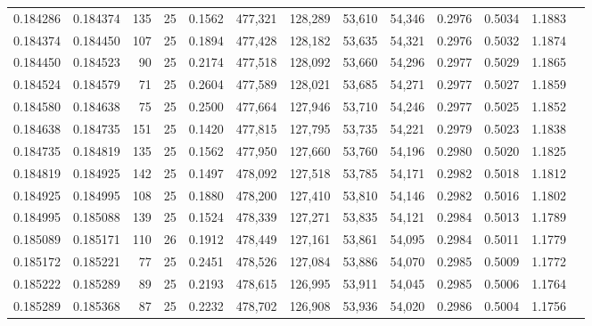 \begin{tabular}{rrrrrrrrrrrrr}
0.184286 & 0.184374 &   135 &  25 &                                     0.1562 & 477,321 & 128,289 &  53,610 &  54,346 & 0.2976 & 0.5034 & 1.1883 \\
0.184374 & 0.184450 &   107 &  25 &                                     0.1894 & 477,428 & 128,182 &  53,635 &  54,321 & 0.2976 & 0.5032 & 1.1874 \\
0.184450 & 0.184523 &    90 &  25 &                                     0.2174 & 477,518 & 128,092 &  53,660 &  54,296 & 0.2977 & 0.5029 & 1.1865 \\
0.184524 & 0.184579 &    71 &  25 &                                     0.2604 & 477,589 & 128,021 &  53,685 &  54,271 & 0.2977 & 0.5027 & 1.1859 \\
0.184580 & 0.184638 &    75 &  25 &                                     0.2500 & 477,664 & 127,946 &  53,710 &  54,246 & 0.2977 & 0.5025 & 1.1852 \\
0.184638 & 0.184735 &   151 &  25 &                                     0.1420 & 477,815 & 127,795 &  53,735 &  54,221 & 0.2979 & 0.5023 & 1.1838 \\
0.184735 & 0.184819 &   135 &  25 &                                     0.1562 & 477,950 & 127,660 &  53,760 &  54,196 & 0.2980 & 0.5020 & 1.1825 \\
0.184819 & 0.184925 &   142 &  25 &                                     0.1497 & 478,092 & 127,518 &  53,785 &  54,171 & 0.2982 & 0.5018 & 1.1812 \\
0.184925 & 0.184995 &   108 &  25 &                                     0.1880 & 478,200 & 127,410 &  53,810 &  54,146 & 0.2982 & 0.5016 & 1.1802 \\
0.184995 & 0.185088 &   139 &  25 &                                     0.1524 & 478,339 & 127,271 &  53,835 &  54,121 & 0.2984 & 0.5013 & 1.1789 \\
0.185089 & 0.185171 &   110 &  26 &                                     0.1912 & 478,449 & 127,161 &  53,861 &  54,095 & 0.2984 & 0.5011 & 1.1779 \\
0.185172 & 0.185221 &    77 &  25 &                                     0.2451 & 478,526 & 127,084 &  53,886 &  54,070 & 0.2985 & 0.5009 & 1.1772 \\
0.185222 & 0.185289 &    89 &  25 &                                     0.2193 & 478,615 & 126,995 &  53,911 &  54,045 & 0.2985 & 0.5006 & 1.1764 \\
0.185289 & 0.185368 &    87 &  25 &                                     0.2232 & 478,702 & 126,908 &  53,936 &  54,020 & 0.2986 & 0.5004 & 1.1756 \\

\end{tabular}
